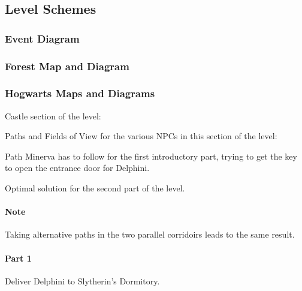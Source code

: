 \pagebreak

\subsection{Level Schemes}

\subsubsection{Event Diagram}

\subsubsection{Forest Map and Diagram}

\subsubsection{Hogwarts Maps and Diagrams}

Castle section of the level:

Paths and Fields of View for the various NPCs in this section of the level:

Path Minerva has to follow for the first introductory part, trying to get the key to open the entrance door for Delphini.

Optimal solution for the second part of the level. 

\paragraph{Note} Taking alternative paths in the two parallel corridoirs leads to the same result.

\paragraph{Part 1} Deliver Delphini to Slytherin's Dormitory.


